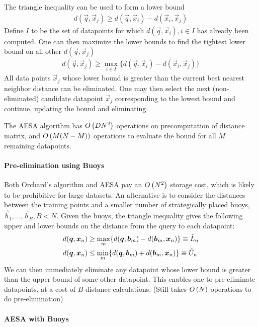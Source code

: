 The triangle inequality can be used to form a lower bound
\begin{align*}
	d(\vec{q},\vec{x}_j)\geq d(\vec{q},\vec{x}_i)-d(\vec{x}_i,\vec{x}_j)
\end{align*}
Define $I$ to be the set of datapoints for which $d(\vec{q},\vec{x}_i),i\in I$ has already been computed. One can then maximize the lower bounds to find the tightest lower bound on all other $d(\vec{q},\vec{x}_j)$
\begin{align*}
	d(\vec{q},\vec{x}_j)\geq\max_{i\in I}\{d(\vec{q},\vec{x}_i)-d(\vec{x}_i,\vec{x}_j)\}
\end{align*}
All data points $\vec{x}_j$ whose lower bound is greater than the current best nearest neighbor distance can be eliminated. One may then select the next (non-eliminated) candidate datapoint $\vec{x}_j$ corresponding to the lowest bound and continue, updating the bound and eliminating.

The AESA algorithm has $O\left(DN^2\right)$ operations on precomputation of distance matrix, and $O\left(M(N-M)\right)$ operations to evaluate the bound for all $M$ remaining datapoints.

\paragraph{Pre-elimination using Buoys}

Both Orchard's algorithm and AESA pay an $O\left(N^2\right)$ storage cost, which is likely to be prohibitive for large datasets. An alternative is to consider the distances between the training points and a smaller number of strategically placed buoys, $\vec{b}_1,\dotsc,\vec{b}_B,B<N$. Given the buoys, the triangle inequality gives the following upper and lower bounds on the distance from the query to each datapoint:
\begin{align*}
	d(\boldsymbol{q},\boldsymbol{x}_n)&\geq\max_m\{d(\boldsymbol{q},\boldsymbol{b}_m)-d(\boldsymbol{b}_m,\boldsymbol{x}_n)\}\equiv\tilde{L}_n \\
	d(\boldsymbol{q},\boldsymbol{x}_n)&\leq\min_m\{d(\boldsymbol{q},\boldsymbol{b}_m)+d(\boldsymbol{b}_m,\boldsymbol{x}_n)\}\equiv\tilde{U}_n
\end{align*}
We can then immediately eliminate any datapoint whose lower bound is greater than the upper bound of some other datapoint. This enables one to pre-eliminate datapoints, at a cost of $B$ distance calculations. (Still takes $O\left(N\right)$ operations to do pre-elimination)

\paragraph{AESA with Buoys}

